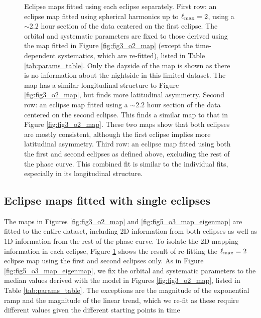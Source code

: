 \documentclass[twocolumn]{aastex631}
\begin{document}
\begin{figure}
    \caption{Eclipse maps fitted using each eclipse separately. First row: an eclipse map fitted using spherical harmonics up to $\ell_{\rm max}=2$, using a $\sim2.2$ hour section of the data centered on the first eclipse. The orbital and systematic parameters are fixed to those derived using the map fitted in Figure \ref{fig:fig3_o2_map} (except the time-dependent systematics, which are re-fitted), listed in Table \ref{tab:params_table}. Only the dayside of the map is shown as there is no information about the nightside in this limited dataset. The map has a similar longitudinal structure to Figure \ref{fig:fig3_o2_map}, but finds more latitudinal asymmetry. Second row: an eclipse map fitted using a $\sim2.2$ hour section of the data centered on the second eclipse. This finds a similar map to that in Figure \ref{fig:fig3_o2_map}. These two maps show that both eclipses are mostly consistent, although the first eclipse implies more latitudinal asymmetry. Third row: an eclipse map fitted using both the first and second eclipses as defined above, excluding the rest of the phase curve. This combined fit is similar to the individual fits, especially in its longitudinal structure.}
    \label{fig:fig6_e1_e2_ee_map}
\end{figure}


\subsection{Eclipse maps fitted with single eclipses}\label{sec:results:single}

The maps in Figures \ref{fig:fig3_o2_map} and \ref{fig:fig5_o3_map_eigenmap} are fitted to the entire dataset, including 2D information from both eclipses as well as 1D information from the rest of the phase curve. To isolate the 2D mapping information in each eclipse, Figure \ref{fig:fig6_e1_e2_ee_map} shows the result of re-fitting the $\ell_{\rm max}=2$ eclipse map using the first and second eclipses only. As in Figure \ref{fig:fig5_o3_map_eigenmap}, we fix the orbital and systematic parameters to the median values derived with the model in Figures \ref{fig:fig3_o2_map}, listed in Table \ref{tab:params_table}. The exceptions are the magnitude of the exponential ramp and the magnitude of the linear trend, which we re-fit as these require different values given the different starting points in time
\end{document}
